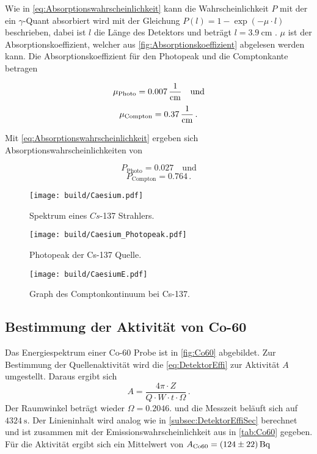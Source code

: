 Wie in \autoref{eq:Absorptionswahrscheinlichkeit} kann die Wahrscheinlichkeit $P$ mit der ein $\gamma$-Quant absorbiert wird mit der Gleichung $P(l) = 1- \exp{(-\mu \cdot l)}$ beschrieben,
dabei ist $l$ die Länge des Detektors und beträgt $l = \SI{3.9}{\centi\meter}$ \cite{v18}.
$\mu$ ist der Absorptionskoeffizient, welcher aus \autoref{fig:Absorptionskoeffizient} abgelesen werden kann. 
Die Absorptionskoeffizient für den Photopeak und die Comptonkante betragen

\begin{equation*}
   \mu_\text{Photo} = \SI{0.007}{\frac{1}{\centi\meter}} \quad \text{und}
\end{equation*}
\begin{equation*}
    \mu_\text{Compton} = \SI{0.37}{\frac{1}{\centi\meter}}\,. 
\end{equation*}

Mit \autoref{eq:Absorptionswahrscheinlichkeit} ergeben sich Absorptionswahrscheinlichkeiten von

\begin{equation*}
    P_\text{Photo} = \num{0.027} \quad \text{und}
 \end{equation*}
\begin{equation*}
     P_\text{Compton} = \num{0.764}\,. 
\end{equation*}


\begin{figure}[H]
    \centering
    \texttt{[image: build/Caesium.pdf]}
    \caption{Spektrum eines $Cs$-137 Strahlers.}
    \label{fig:CeasiumSpektrum}
\end{figure}

\begin{figure}[H]
    \centering
    \texttt{[image: build/Caesium\_Photopeak.pdf]}
    \caption{Photopeak der Cs-137 Quelle.}
    \label{fig:CaesiumPhotopeak}
\end{figure}


\begin{figure}[H]
    \centering
    \texttt{[image: build/CaesiumE.pdf]}
    \caption{Graph des Comptonkontinuum bei Cs-137.}
    \label{fig:Comptonplot}
\end{figure}

\subsection{Bestimmung der Aktivität von Co-60}

Das Energiespektrum einer Co-60 Probe ist in \autoref{fig:Co60} abgebildet.
Zur Bestimmung der Quellenaktivität wird die \autoref{eq:DetektorEffi} zur Aktivität $A$ umgestellt.
Daraus ergibt sich
\begin{equation*}
    A = \frac{4\pi \cdot Z}{Q \cdot W \cdot t \cdot \Omega}\,.
\end{equation*}
Der Raumwinkel beträgt wieder $\Omega = 0.2046$. 
und die Messzeit beläuft sich auf $\SI{4324}{\second}$.
Der Linieninhalt wird analog wie in \autoref{subsec:DetektorEffiSec} berechnet und ist zusammen mit der Emissionswahrscheinlichkeit aus \cite{LNHB} in \autoref{tab:Co60} gegeben.
Für die Aktivität ergibt sich ein Mittelwert von $A_\text{Co60} = \SI{124 \pm 22}{\becquerel}$

